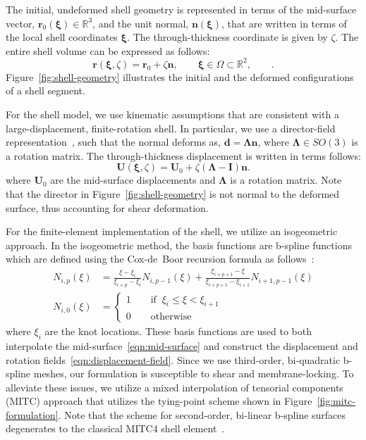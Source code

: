 \documentclass[]{aiaa-tc}
\newcommand{\f}{\frac}
\newcommand{\mb}{\mathbf}
\newcommand{\mbs}{\boldsymbol}
\begin{document}
The initial, undeformed shell geometry is represented in terms of the
mid-surface vector, $\mb{r}_{0}(\mbs{\xi}) \in \mathbb{R}^{3}$, and
the unit normal, $\mb{n}(\mbs{\xi})$, that are written in terms of the
local shell coordinates $\mbs{\xi}$. The through-thickness coordinate
is given by $\zeta$. The entire shell volume can be expressed as
follows:
%
\begin{equation} 
  \mb{r}(\mbs{\xi}, \zeta) = 
  \mb{r}_{0} + \zeta \mb{n}, 
  \qquad \mbs{\xi} \in \Omega \subset \mathbb{R}^{2}, \qquad.
  \label{eqn:mid-surface}
\end{equation}
Figure~\ref{fig:shell-geometry} illustrates the initial and the deformed
configurations of a shell segment. 

For the shell model, we use kinematic assumptions that are consistent
with a large-displacement, finite-rotation shell. In particular, we
use a director-field representation~\cite{Simo:1989:SRG1}, such that
the normal deforms as, $\mb{d} = \mbs{\Lambda} \mb{n}$, where
$\mbs{\Lambda} \in SO(3)$ is a rotation matrix. The through-thickness
displacement is written in terms follows:
%
\begin{equation*}
  \label{eqn:displacement-field}
  \mb{U}(\mbs{\xi}, \zeta) = \mb{U}_{0} + \zeta (\mbs{\Lambda} - \mb{I}) \mb{n}.
\end{equation*}
where $\mb{U}_{0}$ are the mid-surface displacements and
$\mbs{\Lambda}$ is a rotation matrix. Note that the director in
Figure~\ref{fig:shell-geometry} is not normal to the deformed surface,
thus accounting for shear deformation.

For the finite-element implementation of the shell, we utilize an
isogeometric approach. In the isogeometric method, the basis functions
are b-spline functions which are defined using the Cox-de~Boor
recursion formula as follows~\cite{NURBSbook}:
%
\begin{equation}
  \label{eqn:b-spline-basis}
  \begin{aligned}
    N_{i,p}(\xi) & = \f{\xi - \xi_{i}}{\xi_{i+p} - \xi_{i}} N_{i,p-1}(\xi) + \f{\xi_{i+p+1} - \xi}{\xi_{i+p+1} - \xi_{i+1}}N_{i+1,p-1}(\xi) \\
    N_{i,0}(\xi) & = \left\{ 
      \begin{array}{l} 
        1 \qquad \text{if}\;\; \xi_{i} \le \xi < \xi_{i+1} \\
        0 \qquad \text{otherwise}
      \end{array} \right.
  \end{aligned}
\end{equation}
where $\xi_{i}$ are the knot locations.  These basis functions are
used to both interpolate the mid-surface~\eqref{eqn:mid-surface} and
construct the displacement and rotation
fields~\eqref{eqn:displacement-field}. Since we use third-order,
bi-quadratic b-spline meshes, our formulation is susceptible to shear
and membrane-locking. To alleviate these issues, we utilize a mixed
interpolation of tensorial components (MITC) approach that utilizes
the tying-point scheme shown in Figure~\ref{fig:mitc-formulation}.
Note that the scheme for second-order, bi-linear b-spline surfaces
degenerates to the classical MITC4 shell
element~\cite{Dvorkin:1984:CMB}.
\end{document}

